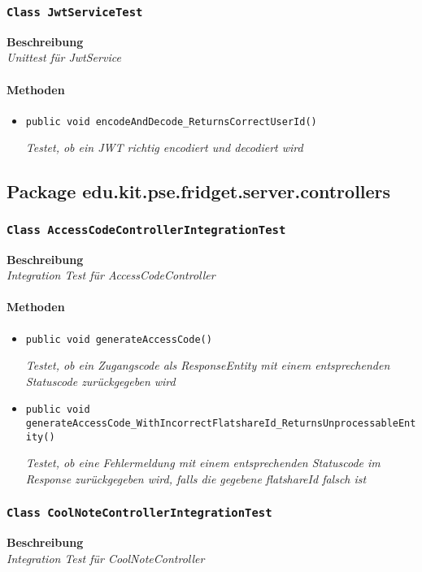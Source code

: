 \subsubsection{\texttt{Class JwtServiceTest}}
\textbf{Beschreibung} \\
\textit{Unittest für JwtService}
\paragraph*{Methoden}
\begin{itemize}
   	\item{\texttt{public void encodeAndDecode\_ReturnsCorrectUserId()}}
   	
   	\textit{Testet, ob ein JWT richtig encodiert und decodiert wird}
\end{itemize}

\newpage

 \subsection{Package edu.kit.pse.fridget.server.controllers}
 \subsubsection{\texttt{Class AccessCodeControllerIntegrationTest}}
 \textbf{Beschreibung} \\
 \textit{Integration Test für AccessCodeController}
 \paragraph*{Methoden}
 \begin{itemize}
 	\item{\texttt{public void generateAccessCode()}}
 	
 	\textit{Testet, ob ein Zugangscode als ResponseEntity mit einem entsprechenden Statuscode zurückgegeben wird}
 	
 	\item{\texttt{public void generateAccessCode\_WithIncorrectFlatshareId\_Returns\-UnprocessableEntity()}}
 	
 	\textit{Testet, ob eine Fehlermeldung mit einem entsprechenden Statuscode im Response zurückgegeben wird, falls die gegebene flatshareId falsch ist}
 \end{itemize}
 
 \subsubsection{\texttt{Class CoolNoteControllerIntegrationTest}}
 \textbf{Beschreibung} \\
 \textit{Integration Test für CoolNoteController}
